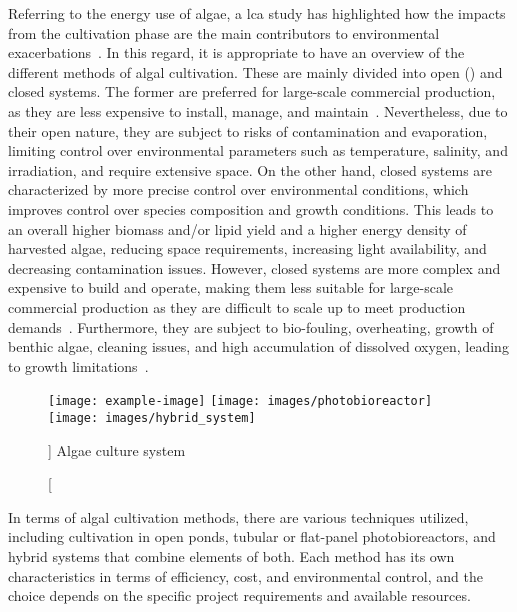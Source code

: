 Referring to the energy use of algae, a \gls{lca} study has highlighted how the impacts from the cultivation phase are the main contributors to environmental exacerbations~\parencite{clarens_Environmental_2010}. In this regard, it is appropriate to have an overview of the different methods of algal cultivation. These are mainly divided into open () and closed systems. The former are preferred for large-scale commercial production, as they are less expensive to install, manage, and maintain~\parencite{roselet_Comparison_2013}. Nevertheless, due to their open nature, they are subject to risks of contamination and evaporation, limiting control over environmental parameters such as temperature, salinity, and irradiation, and require extensive space. On the other hand, closed systems are characterized by more precise control over environmental conditions, which improves control over species composition and growth conditions. This leads to an overall higher biomass and/or lipid yield and a higher energy density of harvested algae, reducing space requirements, increasing light availability, and decreasing contamination issues. However, closed systems are more complex and expensive to build and operate, making them less suitable for large-scale commercial production as they are difficult to scale up to meet production demands~\parencite{resurreccion_Comparison_2012}. Furthermore, they are subject to bio-fouling, overheating, growth of benthic algae, cleaning issues, and high accumulation of dissolved oxygen, leading to growth limitations~\parencite{narala_Comparison_2016}.

\begin{figure}[H]
\centering
		{\texttt{[image: example-image]}}%
\hspace*{\trehbtwsfig}%
		{\texttt{[image: images/photobioreactor]}}%
\hspace*{\trehbtwsfig}%
		{\texttt{[image: images/hybrid\_system]}}%
\caption%
[]%
{Algae culture system}
\label{fig:}
\end{figure}


In terms of algal cultivation methods, there are various techniques utilized, including cultivation in open ponds, tubular or flat-panel photobioreactors, and hybrid systems that combine elements of both. Each method has its own characteristics in terms of efficiency, cost, and environmental control, and the choice depends on the specific project requirements and available resources.


